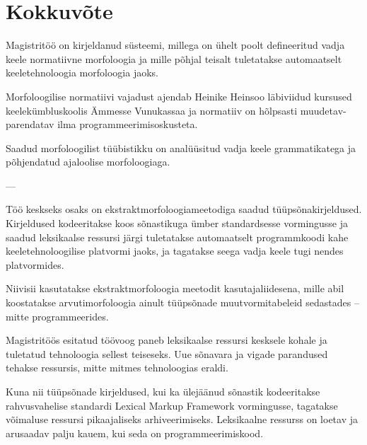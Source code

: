 \documentclass[12pt,a4paper]{article}
\begin{document}


\newpage
\section{Kokkuvõte}
\label{sec:kokkuvõte}

Magistritöö on kirjeldanud süsteemi, millega on ühelt poolt defineeritud vadja keele normatiivne morfoloogia ja mille põhjal teisalt tuletatakse automaatselt keeletehnoloogia morfoloogia jaoks.

Morfoloogilise normatiivi vajadust ajendab Heinike Heinsoo läbiviidud kursused keelekümbluskoolis Ämmesse Vunukassaa ja normatiiv on hõlpsasti muudetav-parendatav ilma programmeerimisoskusteta.

Saadud morfoloogilist tüübistikku on analüüsitud vadja keele grammatikatega ja põhjendatud ajaloolise morfoloogiaga.

---

Töö keskseks osaks on ekstraktmorfoloogiameetodiga saadud tüüpsõnakirjeldused.
Kirjeldused kodeeritakse koos sõnastikuga ümber standardsesse vormingusse ja saadud leksikaalse ressursi järgi tuletatakse automaatselt programmkoodi kahe keeletehnoloogilise platvormi jaoks, ja tagatakse seega vadja keele tugi nendes platvormides.

Niivisii kasutatakse ekstraktmorfoloogia meetodit kasutaja\-liidesena, mille abil koostatakse arvutimorfoloogia ainult tüüpsõnade muutvormitabeleid sedastades -- mitte programmeerides.

Magistritöös esitatud töövoog paneb leksikaalse ressursi kesksele kohale ja tuletatud tehnoloogia sellest teiseseks. Uue sõnavara ja vigade parandused tehakse ressursis, mitte mitmes tehnoloogias eraldi.

Kuna nii tüüpsõnade kirjeldused, kui ka ülejäänud sõnastik kodeeritakse rahvusvahelise standardi Lexical Markup Framework vormingusse, tagatakse võimaluse ressursi pikaajaliseks arhiveerimiseks. Leksikaalne ressurss on loetav ja arusaadav palju kauem, kui seda on programmeerimiskood.
\end{document}
